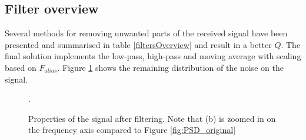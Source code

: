 \subsection{Filter overview}
Several methods for removing unwanted parts of the received signal have been presented and summarised in table \ref{filtersOverview} and result in a better $Q$. The final solution implements the low-pass, high-pass and moving average with scaling based on $F_{alias}$. Figure \ref{Signal_properties_post_filter} shows the remaining distribution of the noise on the signal.

\begin{figure}
	\centering     %
	\caption{Properties of the signal after filtering. Note that (b) is zoomed in on the frequency axis compared to Figure \ref{fig:PSD_original}\label{Signal_properties_post_filter}}.
\end{figure}

